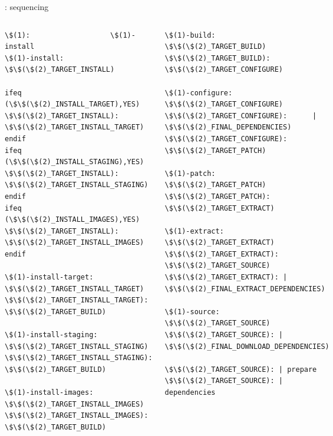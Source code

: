 \begin{frame}[fragile]{: sequencing}

  \begin{columns}
\begin{block}{}
\begin{verbatim}
\$(1):                   \$(1)-install
\$(1)-install:           \$\$(\$(2)_TARGET_INSTALL)

ifeq (\$\$(\$(2)_INSTALL_TARGET),YES)
\$\$(\$(2)_TARGET_INSTALL): \$\$(\$(2)_TARGET_INSTALL_TARGET)
endif
ifeq (\$\$(\$(2)_INSTALL_STAGING),YES)
\$\$(\$(2)_TARGET_INSTALL): \$\$(\$(2)_TARGET_INSTALL_STAGING)
endif
ifeq (\$\$(\$(2)_INSTALL_IMAGES),YES)
\$\$(\$(2)_TARGET_INSTALL): \$\$(\$(2)_TARGET_INSTALL_IMAGES)
endif

\$(1)-install-target:            \$\$(\$(2)_TARGET_INSTALL_TARGET)
\$\$(\$(2)_TARGET_INSTALL_TARGET): \$\$(\$(2)_TARGET_BUILD)

\$(1)-install-staging:                   \$\$(\$(2)_TARGET_INSTALL_STAGING)
\$\$(\$(2)_TARGET_INSTALL_STAGING):        \$\$(\$(2)_TARGET_BUILD)

\$(1)-install-images:            \$\$(\$(2)_TARGET_INSTALL_IMAGES)
\$\$(\$(2)_TARGET_INSTALL_IMAGES): \$\$(\$(2)_TARGET_BUILD)
\end{verbatim}
\end{block}
\begin{block}{}
\begin{verbatim}
\$(1)-build:             \$\$(\$(2)_TARGET_BUILD)
\$\$(\$(2)_TARGET_BUILD):  \$\$(\$(2)_TARGET_CONFIGURE)

\$(1)-configure:                 \$\$(\$(2)_TARGET_CONFIGURE)
\$\$(\$(2)_TARGET_CONFIGURE):      | \$\$(\$(2)_FINAL_DEPENDENCIES)
\$\$(\$(2)_TARGET_CONFIGURE):      \$\$(\$(2)_TARGET_PATCH)

\$(1)-patch:             \$\$(\$(2)_TARGET_PATCH)
\$\$(\$(2)_TARGET_PATCH):  \$\$(\$(2)_TARGET_EXTRACT)

\$(1)-extract:                   \$\$(\$(2)_TARGET_EXTRACT)
\$\$(\$(2)_TARGET_EXTRACT):        \$\$(\$(2)_TARGET_SOURCE)
\$\$(\$(2)_TARGET_EXTRACT): | \$\$(\$(2)_FINAL_EXTRACT_DEPENDENCIES)

\$(1)-source:            \$\$(\$(2)_TARGET_SOURCE)
\$\$(\$(2)_TARGET_SOURCE): | \$\$(\$(2)_FINAL_DOWNLOAD_DEPENDENCIES)

\$\$(\$(2)_TARGET_SOURCE): | prepare
\$\$(\$(2)_TARGET_SOURCE): | dependencies
\end{verbatim}
\end{block}
  \end{columns}
\end{frame}

